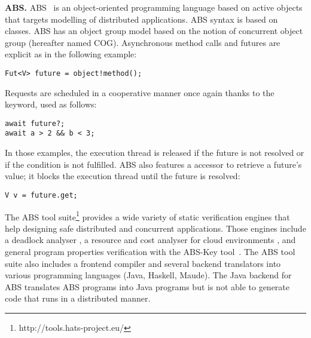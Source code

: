 


\smallskip\noindent\textbf{ABS.}\label{abs}
ABS~\cite{ref:abs} is an object-oriented programming language based on active objects that targets
modelling of distributed applications. ABS syntax is based on classes.
ABS has an object group model
based on the notion of concurrent object
group (hereafter named COG). 
Asynchronous method calls and futures are explicit as in the following example:
\lstset{frame=single} 
\begin{lstlisting}
Fut<V> future = object!method();
\end{lstlisting}

Requests are scheduled in a cooperative manner once again thanks to the  keyword, used as follows:
\begin{lstlisting}
await future?;
await a > 2 && b < 3;
\end{lstlisting}
In those examples, the execution thread is released if the future is not resolved or if the condition is not fulfilled. 
ABS also features a  accessor to retrieve a future's value; it blocks the execution thread until the future
is resolved: 
\begin{lstlisting}
V v = future.get;
\end{lstlisting}	
The ABS tool
suite\footnote{http://tools.hats-project.eu/} provides a wide variety of static verification engines that help
designing safe distributed and concurrent applications. Those engines
include a deadlock analyser \cite{CGM:SoSym2014}, a resource and cost analyser for cloud environments 
\cite{SACO:TACAS14,ABSresourcescost}, and general program properties verification with the ABS-Key tool~\cite{ref:key,ref:noc-abs-key}.
The ABS tool suite also includes a frontend
compiler and several backend translators into various programming
languages (Java, Haskell, Maude). 
The Java backend for ABS translates ABS programs into Java programs but is not able to
generate code that runs in a distributed manner.



